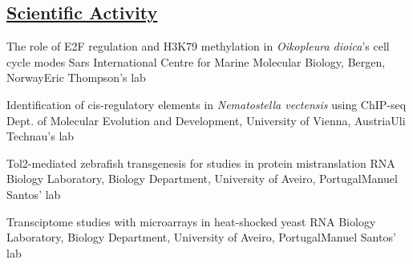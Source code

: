 \documentclass[11pt,a4paper,roman]{moderncv} %
\begin{document}
    \subsection{\underline{Scientific Activity}}

            {The role of E2F regulation and H3K79 methylation in \textit{Oikopleura dioica}'s cell cycle modes}
            {Sars International Centre for Marine Molecular Biology, Bergen, Norway}{Eric Thompson's lab}
            {}
            {}
        
            {Identification of cis-regulatory elements in \textit{Nematostella vectensis} using ChIP-seq}
            {Dept. of Molecular Evolution and Development, University of Vienna, Austria}{Uli Technau's lab}
            {}
            {}

            {Tol2-mediated zebrafish transgenesis for studies in protein mistranslation}
            {RNA Biology Laboratory, Biology Department, University of Aveiro, Portugal}{Manuel Santos' lab}
            {}
            {}

            {Transciptome studies with microarrays in heat-shocked yeast}
            {RNA Biology Laboratory, Biology Department, University of Aveiro, Portugal}{Manuel Santos' lab}
            {}
            {}
\end{document}
